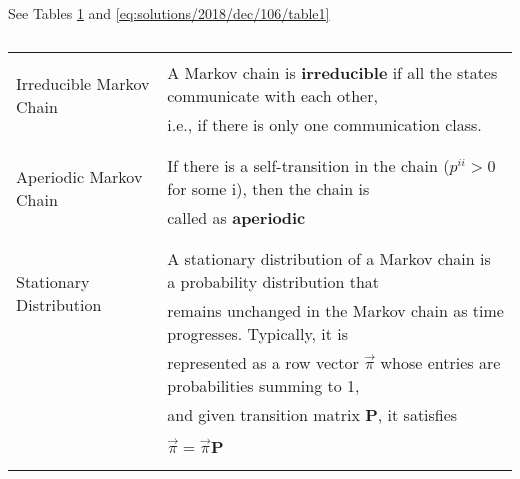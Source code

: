 See Tables \ref{eq:solutions/2018/dec/106/table0} and \ref{eq:solutions/2018/dec/106/table1}


\onecolumn
	\begin{longtable}{|l|l|}
		\hline
		\multirow{3}{*}{Irreducible Markov Chain} 
		& \\
		& A Markov chain is $\textbf{irreducible}$ if all the states communicate with each other,\\
		& i.e., if there is only one communication class.\\
		&\\
		\hline
		\multirow{3}{*}{Aperiodic Markov Chain} & \\
		& If there is a self-transition in the chain ($p^{ii}>0$ for some i), then the chain is\\
		& called as $\textbf{aperiodic}$\\
		& \\
		\hline
		\multirow{3}{*}{Stationary Distribution} & \\
		& A stationary distribution of a Markov chain is a probability distribution that\\
		& remains unchanged in the Markov chain as time progresses. Typically, it is\\
		& represented as a row vector $\Vec{\pi}$ whose entries are probabilities summing to 1,\\ 
		& and given transition matrix $\textbf{P}$, it satisfies\\
		& \\
		&  \qquad \qquad  \qquad$\Vec{\pi} = \Vec{\pi} \textbf{P}$\\
		& \\
		\hline
\caption{}
\label{eq:solutions/2018/dec/106/table0}
	\end{longtable}

